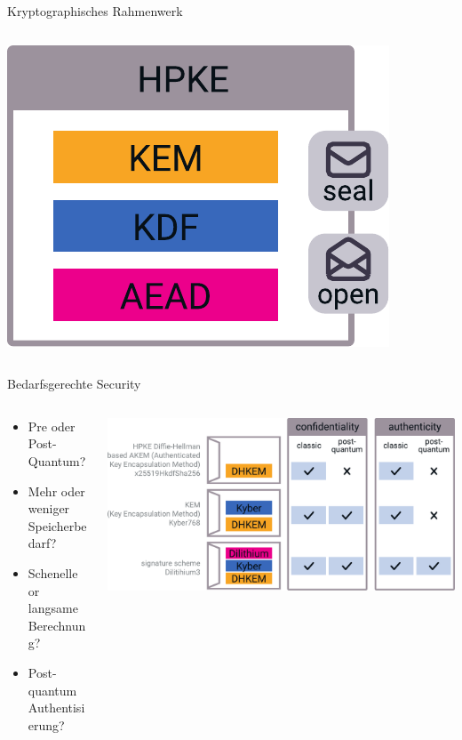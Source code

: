 \begin{frame}[c]{Kryptographisches Rahmenwerk}
\begin{columns}[fullwidth,c]
\begin{column}{.35\linewidth}
        \includegraphics[width=0.8\linewidth]{graphics/hpke}
    \end{column}
  \end{columns}
\end{frame}


\begin{frame}[c]{Bedarfsgerechte Security}
  \begin{columns}[fullwidth,c]
    \begin{column}{.35\linewidth}
      \begin{itemize}
        \item Pre oder Post-Quantum?
        \item Mehr oder weniger Speicherbedarf?
        \item Schenelle or langsame Berechnung?
        \item Post-quantum Authentisierung? 
      \end{itemize}
    \end{column}%
    \begin{column}{.65\linewidth}
      \includegraphics[width=\linewidth]{graphics/hpke variants}
    \end{column}
  \end{columns}
\end{frame}


